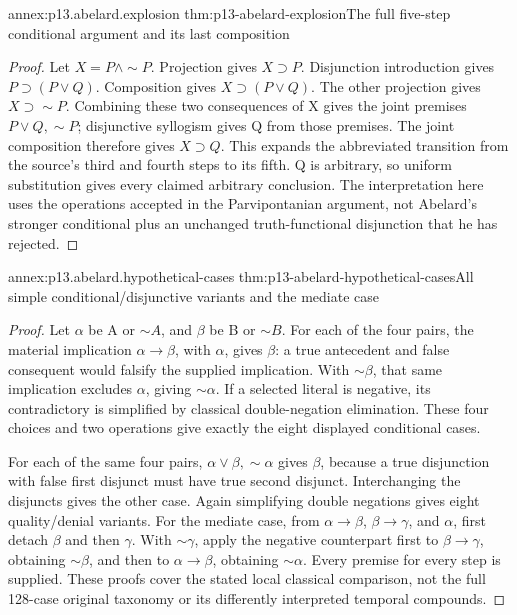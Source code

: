 \begin{annexitem}{annex:p13.abelard.explosion}
 {thm:p13-abelard-explosion}{The full five-step conditional argument and its last composition}
\begin{proof}
Let \(X=P\land\sim P\).
Projection gives \(X\supset P\).
Disjunction introduction gives \(P\supset(P\lor Q)\).
Composition gives \(X\supset(P\lor Q)\).
The other projection gives \(X\supset\sim P\).
Combining these two consequences of X gives
the joint premises \(P\lor Q,\sim P\);
disjunctive syllogism gives Q from those premises.
The joint composition therefore gives \(X\supset Q\).
This expands the abbreviated transition from
the source's third and fourth steps to its fifth.
Q is arbitrary, so uniform substitution gives
every claimed arbitrary conclusion.
The interpretation here uses the operations
accepted in the Parvipontanian argument, not
Abelard's stronger conditional plus an unchanged
truth-functional disjunction that he has rejected.
\end{proof}
\end{annexitem}

\begin{annexitem}{annex:p13.abelard.hypothetical-cases}
 {thm:p13-abelard-hypothetical-cases}{All simple conditional/disjunctive variants and the mediate case}
\begin{proof}
Let \(\alpha\) be A or \(\sim A\), and
\(\beta\) be B or \(\sim B\).
For each of the four pairs, the material implication
\(\alpha\to\beta\), with \(\alpha\), gives \(\beta\):
a true antecedent and false consequent would falsify
the supplied implication.
With \(\sim\beta\), that same implication excludes
\(\alpha\), giving \(\sim\alpha\).
If a selected literal is negative, its contradictory
is simplified by classical double-negation elimination.
These four choices and two operations give exactly
the eight displayed conditional cases.

For each of the same four pairs,
\(\alpha\lor\beta,\sim\alpha\) gives \(\beta\),
because a true disjunction with false first disjunct
must have true second disjunct.
Interchanging the disjuncts gives the other case.
Again simplifying double negations gives eight
quality/denial variants.
For the mediate case, from \(\alpha\to\beta\),
\(\beta\to\gamma\), and \(\alpha\), first detach
\(\beta\) and then \(\gamma\).
With \(\sim\gamma\), apply the negative counterpart
first to \(\beta\to\gamma\), obtaining \(\sim\beta\),
and then to \(\alpha\to\beta\), obtaining \(\sim\alpha\).
Every premise for every step is supplied.
These proofs cover the stated local classical
comparison, not the full 128-case original taxonomy
or its differently interpreted temporal compounds.
\end{proof}
\end{annexitem}
